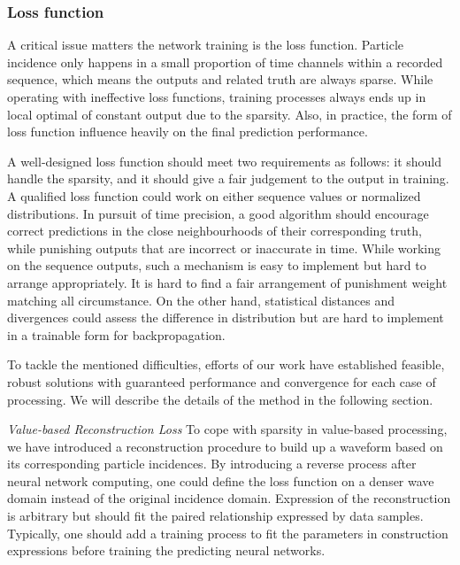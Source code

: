\subsubsection{Loss function}
A critical issue matters the network training is the loss function. Particle incidence only happens in a small proportion of time channels within a recorded sequence, which means the outputs and related truth are always sparse. While operating with ineffective loss functions, training processes always ends up in local optimal of constant output due to the sparsity. Also, in practice, the form of loss function influence heavily on the final prediction performance. 

A well-designed loss function should meet two requirements as follows: it should handle the sparsity, and it should give a fair judgement to the output in training. A qualified loss function could work on either sequence values or normalized distributions. In pursuit of time precision, a good algorithm should encourage correct predictions in the close neighbourhoods of their corresponding truth, while punishing outputs that are incorrect or inaccurate in time. While working on the sequence outputs, such a mechanism is easy to implement but hard to arrange appropriately. It is hard to find a fair arrangement of punishment weight matching all circumstance. On the other hand, statistical distances and divergences could assess the difference in distribution but are hard to implement in a trainable form for backpropagation. 

To tackle the mentioned difficulties, efforts of our work have established feasible, robust solutions with guaranteed performance and convergence for each case of processing. We will describe the details of the method in the following section.

\emph{Value-based Reconstruction Loss}
To cope with sparsity in value-based processing, we have introduced a reconstruction procedure to build up a waveform based on its corresponding particle incidences. By introducing a reverse process after neural network computing, one could define the loss function on a denser wave domain instead of the original incidence domain. Expression of the reconstruction is arbitrary but should fit the paired relationship expressed by data samples. Typically, one should add a training process to fit the parameters in construction expressions before training the predicting neural networks.

